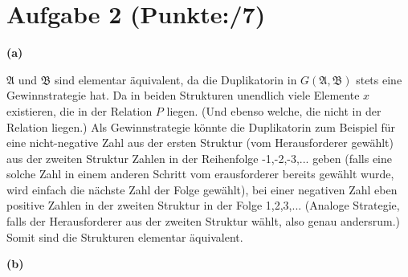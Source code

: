 \documentclass[11pt, a4paper]{article}
\newcommand{\p}{7}
\newcommand{\struc}[1]{\ensuremath{\mathfrak{#1}}}
\begin{document}
\section*{Aufgabe 2 (Punkte:\qquad/\p)}
\textbf{(a)}
\begin{adjustwidth}{20pt}{20pt}
	\struc{A} und \struc{B} sind elementar äquivalent, da die Duplikatorin in $G(\struc{A},\struc{B})$ stets eine Gewinnstrategie hat. Da in beiden Strukturen unendlich viele Elemente $x$
	existieren, die in der Relation $P$ liegen. (Und ebenso welche, die nicht in der Relation liegen.) Als Gewinnstrategie könnte die Duplikatorin zum Beispiel für eine nicht-negative Zahl aus
	der ersten Struktur (vom Herausforderer gewählt) aus der zweiten Struktur Zahlen in der Reihenfolge -1,-2,-3,... geben (falls eine solche Zahl in einem anderen Schritt vom erausforderer bereits gewählt wurde, wird
	einfach die nächste Zahl der Folge gewählt), bei einer negativen Zahl eben positive Zahlen in der zweiten Struktur in der Folge 1,2,3,... (Analoge Strategie, falls der Herausforderer aus
	der zweiten Struktur wählt, also genau andersrum.) Somit sind die Strukturen elementar äquivalent.
	
\end{adjustwidth}
\textbf{(b)}
\end{document}

